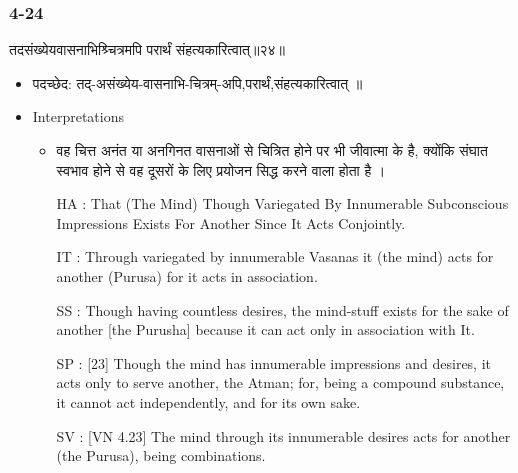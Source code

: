 \begin{frame}[fragile]\frametitle{4-24}
\begin{sanskrit}
तदसंख्येयवासनाभिश्र्चित्रमपि परार्थं संहत्यकारित्वात्॥२४॥
\end{sanskrit}

	\begin{itemize}
	\item पदच्छेद:  तद्-असंख्येय-वासनाभि-चित्रम्-अपि,परार्थं,‌संहत्यकारित्वात्‌ ॥
	\item Interpretations
		\begin{itemize}	
		\item  वह चित्त अनंत या अनगिनत वासनाओं से चित्रित होने पर भी जीवात्मा के है, क्योंकि संघात स्वभाव होने से वह दूसरों के लिए प्रयोजन सिद्ध करने वाला होता है ।
		\item [HA]: That (The Mind) Though Variegated By Innumerable Subconscious Impressions Exists For Another Since It Acts Conjointly.
		\item [IT]: Through variegated by innumerable Vasanas it (the mind) acts for another (Purusa) for it acts in association.
		\item [SS]: Though having countless desires, the mind-stuff exists for the sake of another [the Purusha] because it can act only in association with It.
		\item [SP]: [23] Though the mind has innumerable impressions and desires, it acts only to serve another, the Atman; for, being a compound substance, it cannot act independently, and for its own sake.
		\item [SV]: [VN 4.23] The mind through its innumerable desires acts for another (the Purusa), being combinations. 
		\end{itemize}
	\end{itemize}
\end{frame}



